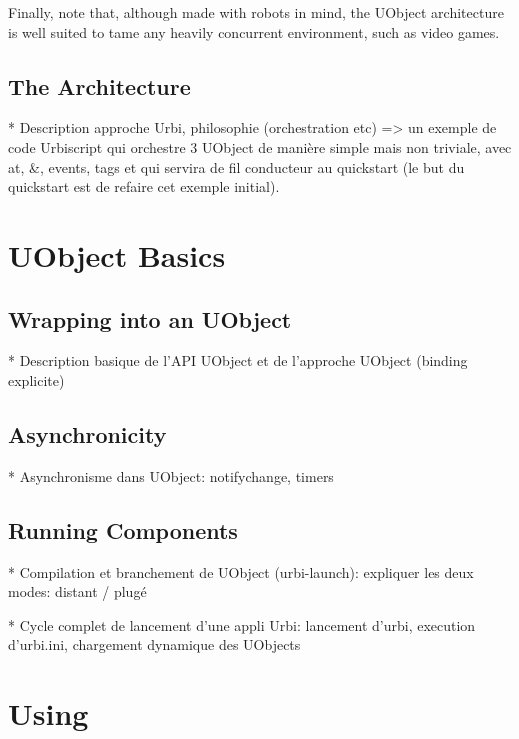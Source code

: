 Finally, note that, although made with robots in mind, the UObject
architecture is well suited to tame any heavily concurrent
environment, such as video games.

\subsection{The \urbi Architecture}

\begin{todo}
  * Description approche Urbi, philosophie (orchestration etc) => un
  exemple de code Urbiscript qui orchestre 3 UObject de manière simple
  mais non triviale, avec at, \&, events, tags et qui servira de fil
  conducteur au quickstart (le but du quickstart est de refaire cet
  exemple initial).
\end{todo}

\section{UObject Basics}

\subsection{Wrapping into an UObject}
\begin{todo}
  * Description basique de l'API UObject et de l'approche UObject
  (binding explicite)
\end{todo}

\subsection{Asynchronicity}
\begin{todo}
  * Asynchronisme dans UObject: notifychange, timers
\end{todo}

\subsection{Running Components}
\begin{todo}
  * Compilation et branchement de UObject (urbi-launch): expliquer les
  deux modes: distant / plugé

  * Cycle complet de lancement d'une appli Urbi: lancement d'urbi,
  execution d'urbi.ini, chargement dynamique des UObjects
\end{todo}

\section{Using \us}

